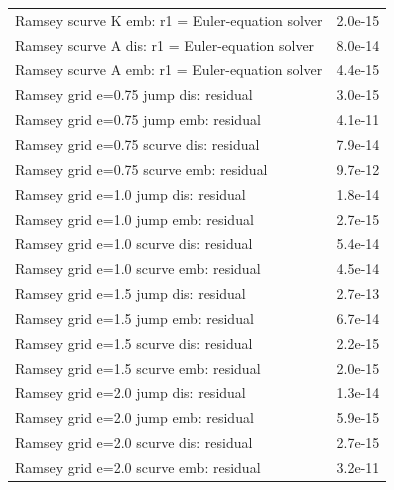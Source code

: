 \begin{tabular}{lc}
Ramsey scurve K emb: r1 = Euler-equation solver & 2.0e-15\\
Ramsey scurve A dis: r1 = Euler-equation solver & 8.0e-14\\
Ramsey scurve A emb: r1 = Euler-equation solver & 4.4e-15\\
Ramsey grid e=0.75 jump dis: residual & 3.0e-15\\
Ramsey grid e=0.75 jump emb: residual & 4.1e-11\\
Ramsey grid e=0.75 scurve dis: residual & 7.9e-14\\
Ramsey grid e=0.75 scurve emb: residual & 9.7e-12\\
Ramsey grid e=1.0 jump dis: residual & 1.8e-14\\
Ramsey grid e=1.0 jump emb: residual & 2.7e-15\\
Ramsey grid e=1.0 scurve dis: residual & 5.4e-14\\
Ramsey grid e=1.0 scurve emb: residual & 4.5e-14\\
Ramsey grid e=1.5 jump dis: residual & 2.7e-13\\
Ramsey grid e=1.5 jump emb: residual & 6.7e-14\\
Ramsey grid e=1.5 scurve dis: residual & 2.2e-15\\
Ramsey grid e=1.5 scurve emb: residual & 2.0e-15\\
Ramsey grid e=2.0 jump dis: residual & 1.3e-14\\
Ramsey grid e=2.0 jump emb: residual & 5.9e-15\\
Ramsey grid e=2.0 scurve dis: residual & 2.7e-15\\
Ramsey grid e=2.0 scurve emb: residual & 3.2e-11\\
\bottomrule\end{tabular}
